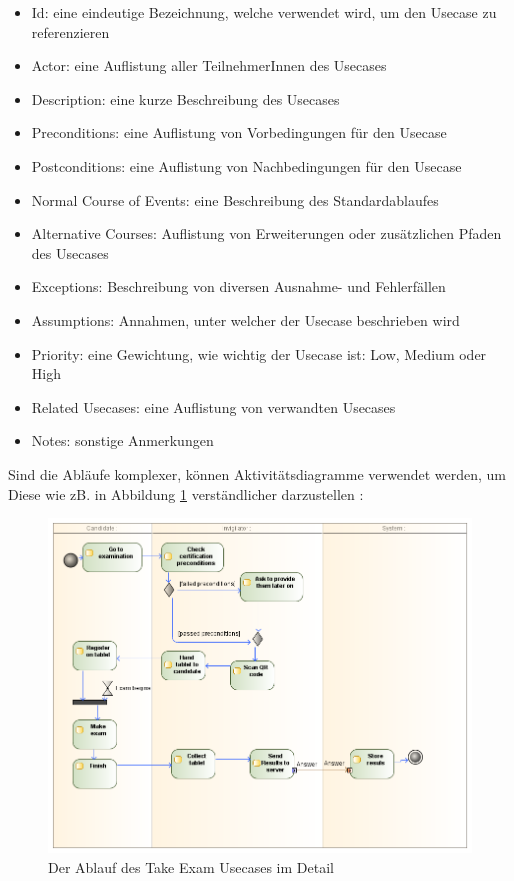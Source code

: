 \begin{itemize}
  \item Id: eine eindeutige Bezeichnung, welche verwendet wird, um den Usecase zu referenzieren
  \item Actor: eine Auflistung aller TeilnehmerInnen des Usecases
  \item Description: eine kurze Beschreibung des Usecases
  \item Preconditions: eine Auflistung von Vorbedingungen für den Usecase
  \item Postconditions: eine Auflistung von Nachbedingungen für den Usecase
  \item Normal Course of Events: eine Beschreibung des Standardablaufes
  \item Alternative Courses: Auflistung von Erweiterungen oder zusätzlichen Pfaden des Usecases
  \item Exceptions: Beschreibung von diversen Ausnahme- und Fehlerfällen
  \item Assumptions: Annahmen, unter welcher der Usecase beschrieben wird
  \item Priority: eine Gewichtung, wie wichtig der Usecase ist: Low, Medium oder High
  \item Related Usecases: eine Auflistung von verwandten Usecases
  \item Notes: sonstige Anmerkungen
\end{itemize}

Sind die Abläufe komplexer, können Aktivitätsdiagramme verwendet werden, um Diese wie zB. in Abbildung \ref{fig:takexdet} verständlicher darzustellen \cite[S. 215]{reqman}:

\begin{figure}[H]
    \centering
    \includegraphics[scale=0.4]{uml/takeexamreq.png}
    \caption{Der Ablauf des Take Exam Usecases im Detail}
    \label{fig:takexdet}
\end{figure}

